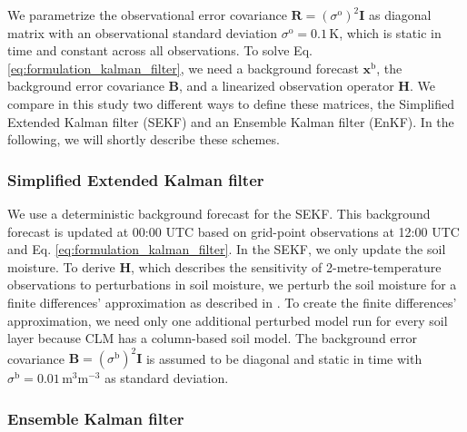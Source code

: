 \documentclass[hess, manuscript]{copernicus}
\begin{document}
We parametrize the observational error covariance $\mathbf{R} = (\sigma^\text{o})^2 \mathbf{I}$ as diagonal matrix with an observational standard deviation $\sigma^\text{o} = 0.1\,\text{K}$, which is static in time and constant across all observations.
To solve Eq. \eqref{eq:formulation_kalman_filter}, we need a background forecast $\mathbf{x}^\text{b}$, the background error covariance $\mathbf{B}$, and a linearized observation operator $\mathbf{H}$.
We compare in this study two different ways to define these matrices, the Simplified Extended Kalman filter (SEKF) and an Ensemble Kalman filter (EnKF).
In the following, we will shortly describe these schemes.

\subsubsection{Simplified Extended Kalman filter}

We use a deterministic background forecast for the SEKF.
This background forecast is updated at 00:00 UTC based on grid-point observations at 12:00 UTC and Eq. \eqref{eq:formulation_kalman_filter}.
In the SEKF, we only update the soil moisture.
To derive $\mathbf{H}$, which describes the sensitivity of 2-metre-temperature observations to perturbations in soil moisture, we perturb the soil moisture for a finite differences' approximation as described in \citet{hess_assimilation_2001,rosnay_simplified_2013}.
To create the finite differences' approximation, we need only one additional perturbed model run for every soil layer because CLM has a column-based soil model.
The background error covariance $\mathbf{B} = (\sigma^\text{b})^2 \mathbf{I}$ is assumed to be diagonal and static in time with $\sigma^\text{b} = 0.01\,\text{m}^3 \text{m}^{-3}$ as standard deviation.

\subsubsection{Ensemble Kalman filter}
\end{document}
